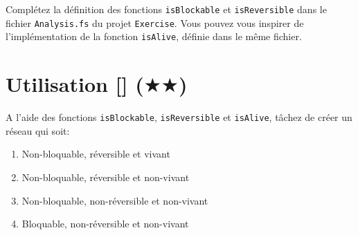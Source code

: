\documentclass[a4paper, titlepage]{article}
\numberwithin{figure}{section}
\numberwithin{table}{section}
\begin{document}
Complétez la définition des fonctions \texttt{isBlockable} et \texttt{isReversible} dans le fichier \texttt{Analysis.fs} du projet \texttt{Exercise}.
Vous pouvez vous inspirer de l'implémentation de la fonction \lstinline|isAlive|, définie dans le même fichier.

\section{Utilisation [\Keyboard] ($\bigstar\bigstar$)}

A l'aide des fonctions \lstinline|isBlockable|, \lstinline|isReversible| et \lstinline|isAlive|, tâchez de créer un réseau qui soit:

\begin{enumerate}
  \item Non-bloquable, réversible et vivant
  \item Non-bloquable, réversible et non-vivant
  \item Non-bloquable, non-réversible et non-vivant
  \item Bloquable, non-réversible et non-vivant
\end{enumerate}
\end{document}
